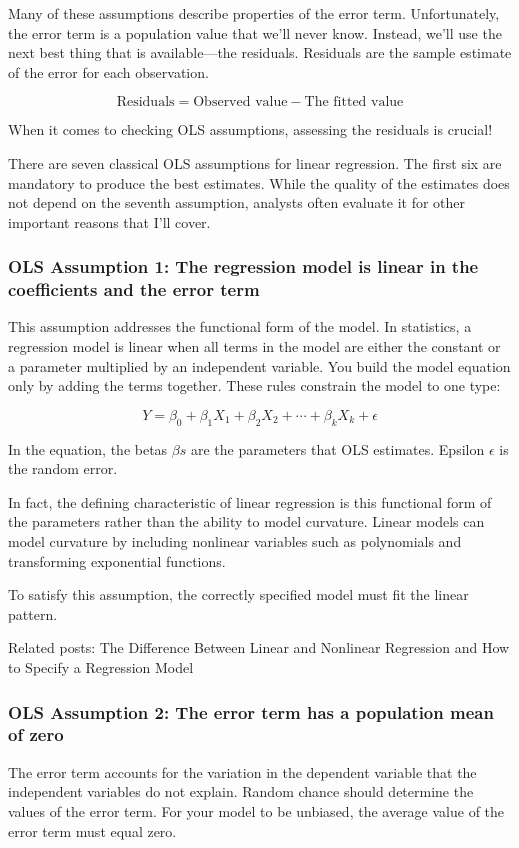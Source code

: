 \documentclass[12pt]{book}
\begin{document}
Many of these assumptions describe properties of the error term. Unfortunately, the error term is a population value that we’ll never know. Instead, we’ll use the next best thing that is available—the residuals. Residuals are the sample estimate of the error for each observation.

\[
\text{Residuals} = \text{Observed value} - \text{The fitted value}
\]

When it comes to checking OLS assumptions, assessing the residuals is crucial!

There are seven classical OLS assumptions for linear regression. The first six are mandatory to produce the best estimates. While the quality of the estimates does not depend on the seventh assumption, analysts often evaluate it for other important reasons that I’ll cover.

\subsubsection{OLS Assumption 1: The regression model is linear in the coefficients and the error term}
This assumption addresses the functional form of the model. In statistics, a regression model is linear when all terms in the model are either the constant or a parameter multiplied by an independent variable. You build the model equation only by adding the terms together. These rules constrain the model to one type:

\[
Y =\beta _{0} + \beta _{1}X_{1} + \beta _{2}X_{2} + \cdots + \beta _{k}X_{k} + \epsilon
\]

In the equation, the betas \(\beta s\) are the parameters that OLS estimates. Epsilon \(\epsilon\) is the random error.

In fact, the defining characteristic of linear regression is this functional form of the parameters rather than the ability to model curvature. Linear models can model curvature by including nonlinear variables such as polynomials and transforming exponential functions.

To satisfy this assumption, the correctly specified model must fit the linear pattern.

Related posts: The Difference Between Linear and Nonlinear Regression and How to Specify a Regression Model

\subsubsection{OLS Assumption 2: The error term has a population mean of zero}
The error term accounts for the variation in the dependent variable that the independent variables do not explain. Random chance should determine the values of the error term. For your model to be unbiased, the average value of the error term must equal zero.
\end{document}
